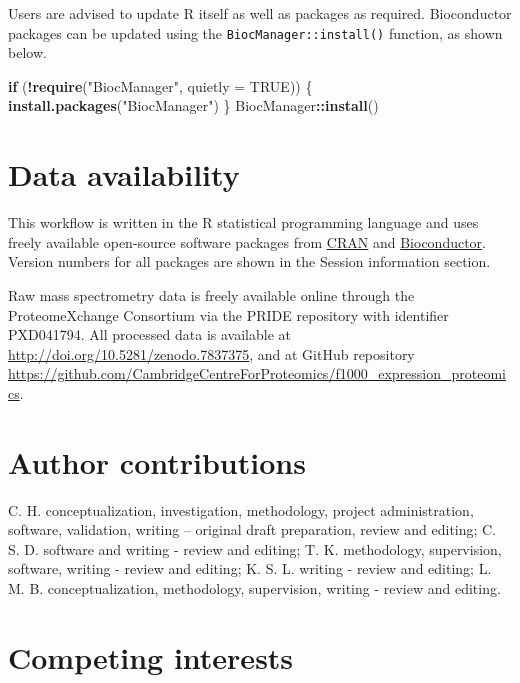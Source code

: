 \documentclass[9pt,a4paper,]{extarticle}
\newenvironment{Shaded}{\begin{snugshade}}{\end{snugshade}}
\newcommand{\AttributeTok}[1]{\textcolor[rgb]{0.13,0.29,0.53}{#1}}
\newcommand{\ConstantTok}[1]{\textcolor[rgb]{0.56,0.35,0.01}{#1}}
\newcommand{\ControlFlowTok}[1]{\textcolor[rgb]{0.13,0.29,0.53}{\textbf{#1}}}
\newcommand{\FunctionTok}[1]{\textcolor[rgb]{0.13,0.29,0.53}{\textbf{#1}}}
\newcommand{\NormalTok}[1]{#1}
\newcommand{\SpecialCharTok}[1]{\textcolor[rgb]{0.81,0.36,0.00}{\textbf{#1}}}
\newcommand{\StringTok}[1]{\textcolor[rgb]{0.31,0.60,0.02}{#1}}
\begin{document}
Users are advised to update R itself as well as packages as required.
Bioconductor packages can be updated using the \texttt{BiocManager::install()}
function, as shown below.

\begin{Shaded}
\begin{Highlighting}[]
\ControlFlowTok{if}\NormalTok{ (}\SpecialCharTok{!}\FunctionTok{require}\NormalTok{(}\StringTok{"BiocManager"}\NormalTok{, }\AttributeTok{quietly =} \ConstantTok{TRUE}\NormalTok{)) \{}
  \FunctionTok{install.packages}\NormalTok{(}\StringTok{"BiocManager"}\NormalTok{)}
\NormalTok{\}}
\NormalTok{BiocManager}\SpecialCharTok{::}\FunctionTok{install}\NormalTok{()}
\end{Highlighting}
\end{Shaded}

\hypertarget{data-availability}{%
\section{Data availability}\label{data-availability}}

This workflow is written in the R statistical programming language and uses
freely available open-source software packages from \href{https://cran.r-project.org}{CRAN}
and \href{https://bioconductor.org}{Bioconductor}. Version numbers for all packages
are shown in the Session information section.

Raw mass spectrometry data is freely available online through the
ProteomeXchange Consortium via the PRIDE repository with identifier PXD041794.
All processed data is available at
\url{http://doi.org/10.5281/zenodo.7837375},
and at GitHub repository \url{https://github.com/CambridgeCentreForProteomics/f1000_expression_proteomics}.

\hypertarget{author-contributions}{%
\section{Author contributions}\label{author-contributions}}

C. H. conceptualization, investigation, methodology, project administration,
software, validation, writing -- original draft preparation, review and editing;
C. S. D. software and writing - review and editing; T. K. methodology,
supervision, software, writing - review and editing; K. S. L. writing - review
and editing; L. M. B. conceptualization, methodology, supervision, writing -
review and editing.

\hypertarget{competing-interests}{%
\section{Competing interests}\label{competing-interests}}
\end{document}
